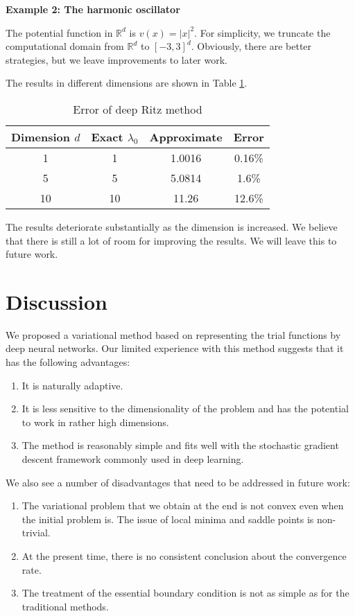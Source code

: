 \documentclass[a4paper,12pt]{article}
\begin{document}
\vspace{.1in}
\noindent
{\bf Example 2: The harmonic oscillator}

The potential function in $\mathbb{R}^d$ is $v(x)=|x|^2$. 
For simplicity, we truncate the computational domain from
$\mathbb{R}^d$ to 
$[-3, 3]^d$.
Obviously, there are better strategies, but we leave improvements
to later work.

The results in different dimensions are shown in Table \ref{tab:ho}.

\begin{table}[!h]
\caption{Error of deep Ritz method}\label{tab:ho}
\begin{center}
\begin{tabular}{c|c|c|c}
\hline
Dimension $d$ & Exact $\lambda_0$ & Approximate & Error \\ \hline
1 & 1 & 1.0016  & 0.16\%  \\ \hline
5 & 5 &  5.0814 & 1.6\% \\ \hline
10 & 10 & 11.26  & 12.6\% \\ \hline
\end{tabular}
\end{center}
\end{table}
The results deteriorate substantially as the dimension is increased.
We believe that there is still a lot of room for improving the results.
We will leave this to future work.



\section{Discussion}

We proposed a variational method based on representing the trial
functions by deep neural networks.
Our limited experience with this method suggests that it has the following
advantages:
\begin{enumerate}
\item It is naturally adaptive.
\item It is less sensitive to the dimensionality of the problem
and has the potential to work in rather high dimensions.
\item The method is reasonably simple and fits well with the stochastic
gradient descent framework commonly used in deep learning.
\end{enumerate}
We also see a number of disadvantages that need to be addressed
in future work:
\begin{enumerate}
\item  The variational problem that we obtain at the end is not
convex even when the initial problem is. 
 The issue of local minima and saddle points is non-trivial.
\item At the present time, there is no consistent conclusion about the
convergence rate.
\item The treatment of the essential boundary condition 
is not as simple as for the traditional methods.
\end{enumerate}
\end{document}
